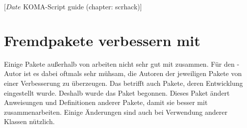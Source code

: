 %
%
%
%
%
%
%
%
% 
%
%
%
%

                 [$Date$
                  KOMA-Script guide (chapter: scrhack)]

\chapter{Fremdpakete verbessern mit }

\BeginIndexGroup
{}
Einige Pakete außerhalb von \KOMAScript{} arbeiten nicht sehr gut mit
\KOMAScript{} zusammen. Für den \KOMAScript-Autor ist es dabei oftmals sehr
mühsam, die Autoren der jeweiligen Pakete von einer Verbesserung zu
überzeugen. Das betrifft auch Pakete, deren Entwicklung eingestellt
wurde. Deshalb wurde das Paket  begonnen. Dieses Paket ändert
Anweisungen und Definitionen anderer Pakete, damit sie besser mit
\KOMAScript{} zusammenarbeiten. Einige Änderungen sind auch bei
Verwendung anderer Klassen nützlich.

